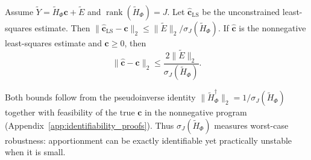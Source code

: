 \begin{proposition}
\label{prop:noise_robust}
Assume \(\widetilde Y=\widetilde H_\Phi\mathbf c+\widetilde E\) and
\(\operatorname{rank}(\widetilde H_\Phi)=J\).  Let
\(\widehat{\mathbf c}_{\mathrm{LS}}\) be the unconstrained least-squares
estimate.  Then
\(\|\widehat{\mathbf c}_{\mathrm{LS}}-\mathbf c\|_2
\le\|\widetilde E\|_2/\sigma_J(\widetilde H_\Phi)\).
If \(\widehat{\mathbf c}\) is the nonnegative least-squares estimate and
\(\mathbf c\ge0\), then
\begin{equation}
\|\widehat{\mathbf c}-\mathbf c\|_2
\le
\frac{2\|\widetilde E\|_2}{\sigma_J(\widetilde H_\Phi)}.
\label{eq:nnls_noise_bound}
\end{equation}
\end{proposition}

Both bounds follow from the pseudoinverse identity
\(\|\widetilde H_\Phi^\dagger\|_2=1/\sigma_J(\widetilde H_\Phi)\) together with
feasibility of the true \(\mathbf c\) in the nonnegative program
(Appendix~\ref{app:identifiability_proofs}).  Thus
\(\sigma_J(\widetilde H_\Phi)\) measures worst-case robustness: apportionment can be
exactly identifiable yet practically unstable when it is small.

